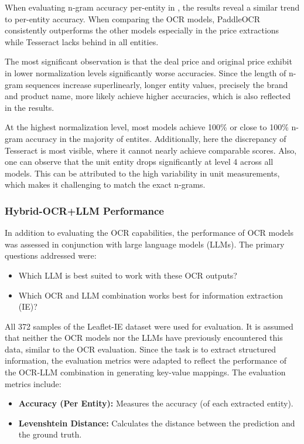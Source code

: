 \documentclass[11pt]{article}
\begin{document}
When evaluating n-gram accuracy per-entity in , the results reveal a similar trend to per-entity accuracy. When comparing the OCR models, PaddleOCR consistently outperforms the other models especially in the price extractions while Tesseract lacks behind in all entities.

The most significant observation is that the deal price and original price exhibit in lower normalization levels significantly worse accuracies. Since the length of n-gram sequences increase superlinearly, longer entity values, precisely the brand and product name, more likely achieve higher accuracies, which is also reflected in the results.

At the highest normalization level, most models achieve 100\% or close to 100\% n-gram accuracy in the majority of entites. Additionally, here the discrepancy of Tesseract is most visible, where it cannot nearly achieve comparable scores. Also, one can observe that the unit entity drops significantly at level 4 across all models. This can be attributed to the high variability in unit measurements, which makes it challenging to match the exact n-grams.


\subsubsection{Hybrid-OCR+LLM Performance}

In addition to evaluating the OCR capabilities, the performance of OCR models was assessed in conjunction with large language models (LLMs). The primary questions addressed were:
\begin{itemize}
    \item Which LLM is best suited to work with these OCR outputs?
    \item Which OCR and LLM combination works best for information extraction (IE)?
\end{itemize}

All 372 samples of the Leaflet-IE dataset were used for evaluation. It is assumed that neither the OCR models nor the LLMs have previously encountered this data, similar to the OCR evaluation. Since the task is to extract structured information, the evaluation metrics were adapted to reflect the performance of the OCR-LLM combination in generating key-value mappings. The evaluation metrics include:
\begin{itemize}
    \item \textbf{Accuracy (Per Entity):} Measures the accuracy (of each extracted entity).
    \item \textbf{Levenshtein Distance:} Calculates the distance between the prediction and the ground truth.
\end{itemize}
\end{document}
